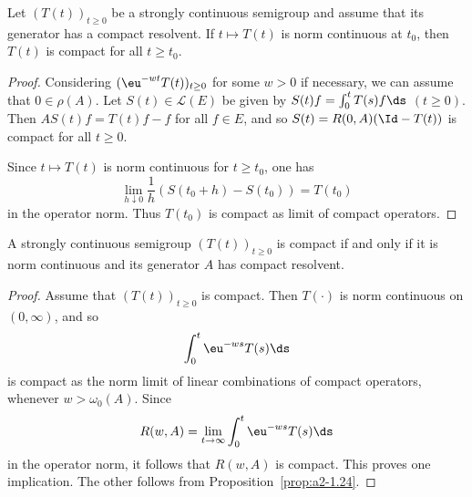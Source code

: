 \begin{proposition}\label{prop:a2-1.24}
Let $(T(t))_{t\geq 0}$ be a strongly continuous semigroup and assume that its generator has a compact resolvent.
If\/ $t \mapsto T(t)$ is norm continuous at $t_0$, then $T(t)$ is compact for all $t \geq t_0$.
\end{proposition}
\begin{proof}
Considering $(\eu^{-wt}T(t))_{t\geq 0}$ for some $w > 0$ if necessary, we can assume that $0 \in \rho(A)$.
Let $S(t) \in \mathcal{L}(E)$ be given by 
$S(t)f = \int_0^t T(s)f \ds$ $(t \geq 0)$.
Then $AS(t)f = T(t)f - f$ for all $f \in E$, and so $S(t) = R(0,A)(\Id-T(t))$ is compact for all $t \geq 0$.

Since $t \mapsto T(t)$ is norm continuous for $t \geq t_0$, one has 
%
\[
	\lim_{h \downarrow 0} \frac{1}{h}(S(t_0+h)-S(t_0)) = T(t_0)
\]
%
in the operator norm.
Thus $T(t_0)$ is compact as limit of compact operators.
\end{proof}
\begin{theorem}\label{thm:a2-1.25}
A strongly continuous semigroup $(T(t))_{t\geq 0}$ is compact if and only if it is norm continuous and its generator $A$ has compact resolvent.
\end{theorem}
\begin{proof}
Assume that $(T(t))_{t\geq 0}$ is compact. Then $T(\cdot)$ is norm continuous on $(0,\infty)$, and so 
\[
    \int_{0}^{t} \eu^{-ws} T(s) \ds
\]
is compact as the norm limit of linear combinations of compact operators, whenever $w > \omega_{0}(A)$.
Since 
\[
    R(w,A) = \lim_{t \to \infty} \int_{0}^{t} \eu^{-ws} T(s) \ds
\]
in the operator norm, it follows that $R(w,A)$ is compact.
This proves one implication.
The other follows from Proposition~\ref{prop:a2-1.24}. 
\end{proof}
